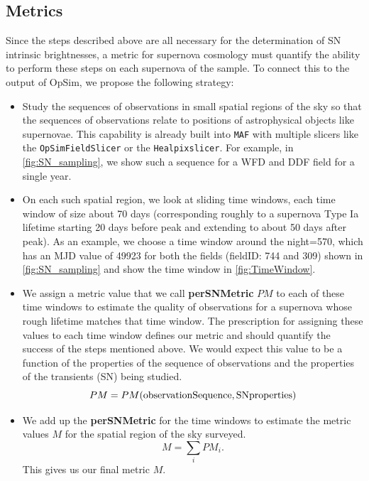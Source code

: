 
\subsection{Metrics}
\label{sec:\secname:metrics}


Since the steps described above are all necessary for the determination of
SN intrinsic brightnesses, a metric for supernova cosmology must
quantify the ability to perform these steps on each supernova of the
sample. To connect this to the output of OpSim, we propose the
following strategy:
\begin{itemize}
    \item Study the sequences of observations in small spatial regions
    of the sky so that the sequences of observations relate to positions
    of astrophysical objects like supernovae. This capability is already
    built into \texttt{MAF} with multiple slicers like the
    \texttt{OpSimFieldSlicer} or the \texttt{Healpixslicer}. For example, in
    \autoref{fig:SN_sampling}, we show such a sequence for a WFD and
    DDF field for a single year.
    \item On each such spatial region, we look at sliding time windows,
    each time window of size about 70 days (corresponding roughly to a
    supernova Type Ia  lifetime starting 20 days before peak and
    extending to about 50 days after peak). As an example, we choose a
    time window around the night=570, which has an MJD value of 49923
    for both the fields (fieldID: 744 and 309) shown in
    \autoref{fig:SN_sampling} and show the time window in
    \autoref{fig:TimeWindow}.
    \item  We assign a metric value that we call \textbf{perSNMetric}
    $PM$ to each of these time windows to estimate the quality of
    observations for a supernova whose rough lifetime matches that time
    window. The prescription for assigning these values to each
    time window defines our metric and should quantify the success of
    the steps mentioned above. We would expect this value to be a
    function of the properties of the sequence of observations and the
    properties of the transients (SN) being studied. $$ PM =
    PM(\rm{observation Sequence, SN properties})$$
    \item We add up the \textbf{perSNMetric} for the time windows to
    estimate the metric values $M$ for the spatial region of the sky
    surveyed. $$M = \sum_i PM_i. $$ This gives us our final metric $M$. 
\end{itemize}


